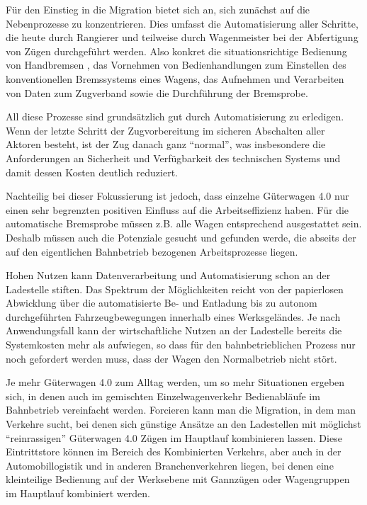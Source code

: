 Für den Einstieg in die Migration bietet sich an, sich zunächst auf die Nebenprozesse zu konzentrieren. Dies umfasst die Automatisierung aller Schritte, die heute durch Rangierer und teilweise durch Wagenmeister bei der Abfertigung von Zügen durchgeführt werden. Also konkret die situationsrichtige Bedienung von Handbremsen%
, das Vornehmen von Bedienhandlungen zum Einstellen des konventionellen Bremssystems eines Wagens, das Aufnehmen und Verarbeiten von Daten zum Zugverband sowie die Durchführung der Bremsprobe.

All diese Prozesse sind grundsätzlich gut durch Automatisierung zu erledigen. Wenn der letzte Schritt der Zugvorbereitung im sicheren Abschalten aller Aktoren besteht, ist der Zug danach ganz "`normal"', was insbesondere die Anforderungen an Sicherheit und Verfügbarkeit des technischen Systems und damit dessen Kosten deutlich reduziert.

Nachteilig bei dieser Fokussierung ist jedoch, dass einzelne Güterwagen 4.0 nur einen sehr begrenzten positiven Einfluss auf die Arbeitseffizienz haben. Für die automatische Bremsprobe müssen z.B. alle Wagen entsprechend ausgestattet sein. Deshalb müssen auch die Potenziale gesucht und gefunden werde, die abseits der auf den eigentlichen Bahnbetrieb bezogenen Arbeitsprozesse liegen.  

Hohen Nutzen kann Datenverarbeitung und Automatisierung schon an der Ladestelle stiften. Das Spektrum der Möglichkeiten reicht von der papierlosen Abwicklung über die automatisierte Be- und Entladung bis zu autonom durchgeführten Fahrzeugbewegungen innerhalb eines Werksgeländes. Je nach Anwendungsfall kann der wirtschaftliche Nutzen an der Ladestelle bereits die Systemkosten mehr als aufwiegen, so dass für den bahnbetrieblichen Prozess nur noch gefordert werden muss, dass der Wagen den Normalbetrieb nicht stört.

Je mehr Güterwagen 4.0 zum Alltag werden, um so mehr Situationen ergeben sich, in denen auch im gemischten Einzelwagenverkehr Bedienabläufe im Bahnbetrieb vereinfacht werden. Forcieren kann man die Migration, in dem man Verkehre sucht, bei denen sich günstige Ansätze an den Ladestellen mit möglichst "`reinrassigen"' Güterwagen 4.0 Zügen im Hauptlauf kombinieren lassen. Diese Eintrittstore können im Bereich des Kombinierten Verkehrs, aber auch in der Automobillogistik und in anderen Branchenverkehren liegen, bei denen eine kleinteilige Bedienung auf der Werksebene mit Gannzügen oder Wagengruppen im Hauptlauf kombiniert werden.

